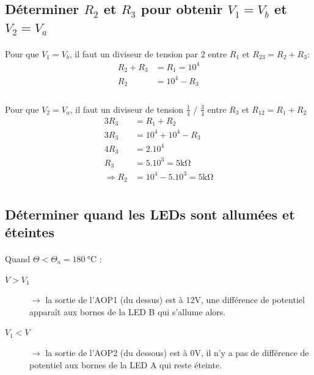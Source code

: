 \documentclass{article}
\begin{document}
\subsection{Déterminer $R_2$ et $R_3$ pour obtenir $V_1 = V_b$ et $V_2 = V_a$}
\paragraph{}
Pour que $V_1 = V_b$, il faut un diviseur de tension par 2 entre $R_1$ et $R_{23} = R_2 + R_3$:
\begin{align*}
    R_2 + R_3 &= R_1 = 10^4\\
    R_2 &= 10^4 - R_3\\
\end{align*}

\paragraph{}
Pour que $V_2 = V_a$, il faut un diviseur de tension $\frac{1}{4}$ / $\frac{3}{4}$ entre $R_3$ et $R_{12} = R_1 + R_2$
\begin{align*}
    3R_3 &= R_1 + R_2\\
    3R_3 &= 10^4 + 10^4 - R_3\\
    4R_3 &= 2.10^4\\
    R_3 &= 5.10^3 = 5\si{\kilo\ohm}\\
    \Rightarrow R_2 &= 10^4 - 5.10^3 = 5\si{\kilo\ohm}\\
\end{align*}

\subsection{Déterminer quand les LEDs sont allumées et éteintes}
\paragraph{}
Quand $\Theta < \Theta_a = \SI{180}{\celsius}$ :
\begin{description}
    \item[$V > V_1$] $\rightarrow$ la sortie de l'AOP1 (du dessus) est à 12V, une différence de potentiel apparaît aux bornes de la LED B qui s'allume alors.
    \item[$V_1 < V$] $\rightarrow$ la sortie de l'AOP2 (du dessous) est à 0V, il n'y a pas de différence de potentiel aux bornes de la LED A qui reste éteinte.
\end{description} 
\end{document}
